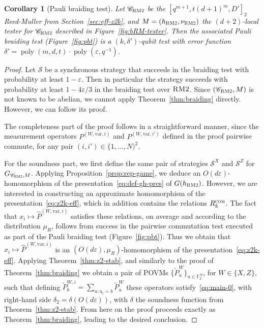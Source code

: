 \documentclass[11pt]{article}
\newtheorem{corollary}[theorem]{Corollary}
\theoremstyle{definition}
\newcommand{\code}{\mathscr{C}}
\newcommand{\strategy}{\mathscr{S}}
\newcommand{\F}{\ensuremath{\mathbb{F}}}
\newcommand{\com}{\textsc{com}}
\newcommand{\bRM}{\ensuremath{\textsc{RM2}}}
\DeclareMathOperator{\poly}{poly}
\newcommand{\eps}{\varepsilon}
\newcommand{\var}{\mathrm{var}}
\begin{document}
\begin{corollary}[Pauli braiding test]
Let $\code_\bRM$ be the $[q^{m+1},t(d+1)^m,D']_2$ Reed-Muller from Section~\ref{sec:eff-z2k}, and $M=(h_\bRM,\nu_\bRM)$ the $(d+2)$-local tester for $\code_\bRM$ described in Figure~\ref{fig:bRM-tester}. Then the associated Pauli braiding test (Figure~\ref{fig:pbt}) is a $(k,\delta')$-qubit test with error function $\delta' = \poly(m,d,t)\cdot\poly(\eps,q^{-1})$.
\end{corollary}

\begin{proof}
Let $\strategy$ be a synchronous strategy that succeeds in the braiding test with probability at least $1-\eps$. Then in particular the strategy succeeds with probability at least $1-4\eps/3$ in the braiding test over $\bRM$. Since $(\code_\bRM,M)$ is not known to be abelian, we cannot apply Theorem~\ref{thm:braiding} directly. However, we can follow its proof. 

The completeness part of the proof follows in a straightforward manner, since the measurement operators $P^{(W,\var,i)}$ and $P^{(W,\var,i')}$ defined in the proof pairwise commute, for any pair $(i,i')\in \{1,\ldots,N)^2$. 

For the soundness part, we first define the same pair of strategies $\strategy^X$ and $\strategy^Z$ for $G_{\code_\bRM,M}$. Applying Proposition~\ref{prop:rep-game}, we deduce an $O(d\eps)$-homomorphism of the presentation~\eqref{eq:def-gh-pres} of $G(h_\bRM)$. However, we are interested in constructing an approximate homomorphism of the presentation~\eqref{eq:z2k-eff}, which in addition contains the relations $R_k^\com$. The fact that $x_i \mapsto \widehat{P}^{(W,\var,i)}$ satisfies these relations, on average and according to the distribution $\mu_R$, follows from success in the pairwise commutation test executed as part of the Pauli braiding test (Figure~\ref{fig:pbt}). Thus we obtain that $x_i \mapsto \widehat{P}^{(W,\var,i)}$ is an $(O(d\eps),\mu_R)$-homomorphism of the presentation~\eqref{eq:z2k-eff}. Applying Theorem~\ref{thm:z2-stab}, and similarly to the proof of Theorem~\ref{thm:braiding} we obtain a pair of POVMs $\{\tilde{P}^W_u\}_{u\in\F_2^N}$, for $W\in\{X,Z\}$, such that defining $\tilde{P}^{W,i}_b = \sum_{u:u_i=b} \tilde{P}^W_u$ these operators satisfy~\eqref{eq:main-0}, with right-hand side $\delta_2 = \delta(O(d\eps))$, with $\delta$ the soundness function from Theorem~\ref{thm:z2-stab}. From here on the proof proceeds exactly as Theorem~\ref{thm:braiding}, leading to the desired conclusion. 
\end{proof}
\end{document}
